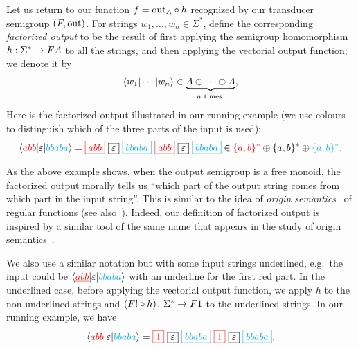 Let us return to our function $f = \mathrm{out}_A \circ h$ recognized by our transducer semigroup $(\functor,\outfun)$.
For strings $w_1,\ldots,w_n \in \Sigma^*$, define the corresponding \emph{factorized output} to be the result of first applying the semigroup homomorphism $h : \Sigma^* \to \functor A$ to all the strings, and then applying the vectorial output function; we denote it by 
\begin{align*}
\tuple{w_1| \cdots | w_n} \in \myunderbrace{A \oplus \cdots \oplus A}{$n$ times},
\end{align*}
Here is the factorized output illustrated in our running example (we use colours to distinguish which of the three parts of the input is used):
\begin{align*}
        \tuple{\red{abb} | \varepsilon | \blue{bbaba}} =  
        \red{\boxed{abb}} \ 
        \boxed{\varepsilon} \ 
        \blue{\boxed{bbaba}} \ 
        \red{\boxed{abb}} \ 
        \boxed{\varepsilon} \
        \blue{\boxed{bbaba}} \in \red{\set{a,b}^*} \oplus \set{a,b}^*  \oplus \blue{\set{a,b}^*}.
\end{align*}
\begin{remark}
As the above example shows, when the output semigroup is a free monoid, the factorized output morally tells us \enquote{which part of the output string comes from which part in the input string}. This is similar to the idea of \emph{origin semantics}~\cite{bojanczykTransducersOriginInformation2014} of regular functions (see also~\cite[Section~5]{MuschollPuppis}). Indeed, our definition of factorized output is inspired by a similar tool of the same name that appears in the study of origin semantics~\cite[Section~2]{bojanczykTransducersOriginInformation2014}.
\end{remark}

We also use a similar notation but with some input strings underlined, e.g.~the input could be $\langle {\color{red}\underline{abb}} | \varepsilon | {\color{cyan}bbaba} \rangle$ with an underline for the first red part. In the underlined case, before applying the vectorial output function, we apply $h$ to the non-underlined strings and
$(\functor! \circ h) \colon \Sigma^* \to \functor1$
to the underlined strings. In our running example, we have
    \begin{align*}
        \tuple{\red{\underline{abb}} | \varepsilon | \blue{bbaba}} =  
        \red{\boxed{1}} \ 
        \boxed{\varepsilon} \
        \blue{\boxed{bbaba}} \ 
        \red{\boxed{1}} \ 
        \boxed{\varepsilon} \
        \blue{\boxed{bbaba}}.
        \end{align*}

